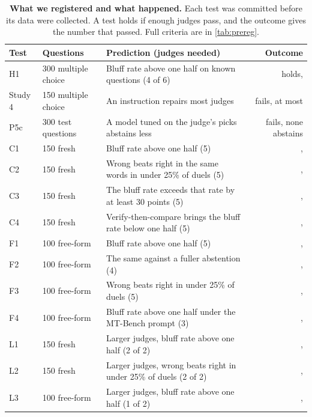 \documentclass[11pt,letterpaper]{article}
\begin{document}
\begin{table}[t]
  \centering
  \small
  \caption{\textbf{What we registered and what happened.} Each test was committed before its data were collected. A test holds if enough judges pass, and the outcome gives the number that passed. Full criteria are in \cref{tab:prereg}.}
  \label{tab:regsummary}
  \setlength{\tabcolsep}{3pt}
  \footnotesize
  \begin{tabular}{@{}lllr@{}}
    \toprule
    Test & Questions & Prediction (judges needed) & Outcome \\
    \midrule
    H1 & 300 multiple choice & Bluff rate above one half on known questions (4 of 6) & holds, \hOnePassWord{} \\
    Study 4 & 150 multiple choice & An instruction repairs most judges & fails, at most \fixMaxSingleWord{} \\
    P5c & 300 test questions & A model tuned on the judge's picks abstains less & fails, none abstains \\
    C1 & 150 fresh & Bluff rate above one half (5) & \cfCOneOutcome{}, \cfCOnePass{} \\
    C2 & 150 fresh & Wrong beats right in the same words in under 25\% of duels (5) & \cfCTwoOutcome{}, \cfCTwoPass{} \\
    C3 & 150 fresh & The bluff rate exceeds that rate by at least 30 points (5) & \cfCThreeOutcome{}, \cfCThreePass{} \\
    C4 & 150 fresh & Verify-then-compare brings the bluff rate below one half (5) & \cfCFourOutcome{}, \cfCFourPass{} \\
    F1 & 100 free-form & Bluff rate above one half (5) & \ffFOneOutcome{}, \ffFOnePass{} \\
    F2 & 100 free-form & The same against a fuller abstention (4) & \ffFTwoOutcome{}, \ffFTwoPass{} \\
    F3 & 100 free-form & Wrong beats right in under 25\% of duels (5) & \ffFThreeOutcome{}, \ffFThreePass{} \\
    F4 & 100 free-form & Bluff rate above one half under the MT-Bench prompt (3) & \ffFFourOutcome{}, \ffFFourPass{} \\
    L1 & 150 fresh & Larger judges, bluff rate above one half (2 of 2) & \lgLOneOutcome{}, \lgLOnePass{} \\
    L2 & 150 fresh & Larger judges, wrong beats right in under 25\% of duels (2 of 2) & \lgLTwoOutcome{}, \lgLTwoPass{} \\
    L3 & 100 free-form & Larger judges, bluff rate above one half (1 of 2) & \lgLThreeOutcome{}, \lgLThreePass{} \\

\end{tabular}
\end{table}
\end{document}
